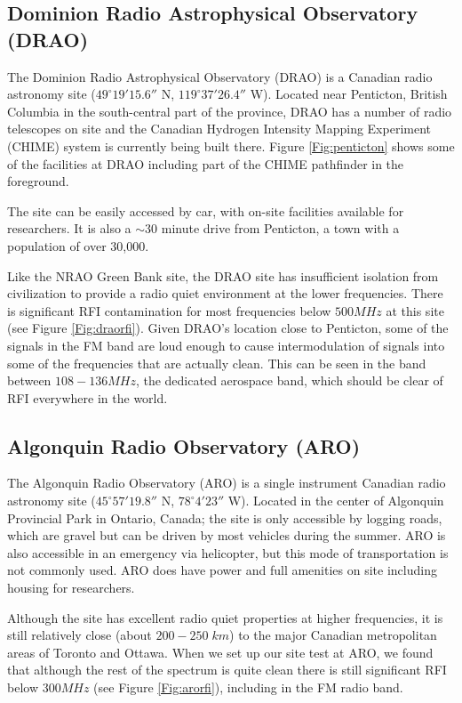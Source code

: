 \subsection{Dominion Radio Astrophysical Observatory (DRAO)}

The Dominion Radio Astrophysical Observatory (DRAO) is a Canadian radio astronomy site ($49^\circ 19' 15.6''$ N, $119^\circ 37' 26.4''$ W). Located near Penticton, British Columbia in the south-central part of the province, DRAO has a number of radio telescopes on site and the Canadian Hydrogen Intensity Mapping Experiment (CHIME) system is currently being built there. Figure \ref{Fig:penticton} shows some of the facilities at DRAO including part of the CHIME pathfinder in the foreground. 

The site can be easily accessed by car, with on-site facilities available for researchers. It is also a $\sim$30 minute drive from Penticton, a town with a population of over 30,000. 

Like the NRAO Green Bank site, the DRAO site has insufficient isolation from civilization to provide a radio quiet environment at the lower frequencies. There is significant RFI contamination for most frequencies below $500 MHz$ at this site (see Figure \ref{Fig:draorfi}). Given DRAO's location close to Penticton, some of the signals in the FM band are loud enough to cause intermodulation of signals into some of the frequencies that are actually clean. This can be seen in the band between $108-136 MHz$, the dedicated aerospace band, which should be clear of RFI everywhere in the world. 


\subsection{Algonquin Radio Observatory (ARO)}

The Algonquin Radio Observatory (ARO) is a single instrument Canadian radio astronomy site ($45^\circ 57' 19.8''$ N, $78^\circ 4' 23''$ W). Located in the center of Algonquin Provincial Park in Ontario, Canada; the site is only accessible by logging roads, which are gravel but can be driven by most vehicles during the summer. ARO is also accessible in an emergency via helicopter, but this mode of transportation is not commonly used. ARO does have power and full amenities on site including housing for researchers. 

Although the site has excellent radio quiet properties at higher frequencies, it is still relatively close (about $200-250 \; km$) to the major Canadian metropolitan areas of Toronto and Ottawa. When we set up our site test at ARO, we found that although the rest of the spectrum is quite clean there is still significant RFI below $300 MHz$ (see Figure \ref{Fig:arorfi}), including in the FM radio band. 


